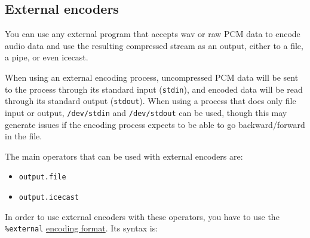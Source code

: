 \documentclass{book}
\begin{document}

\subsection{External encoders}
You can use any external program that accepts wav or raw PCM data to encode
audio data and use the resulting compressed stream as an output, either to a
file, a pipe, or even icecast.

When using an external encoding process, uncompressed PCM data will be sent to
the process through its standard input (\verb+stdin+), and encoded data will be
read through its standard output (\verb+stdout+). When using a process that does
only file input or output, \verb+/dev/stdin+ and \verb+/dev/stdout+ can be used,
though this may generate issues if the encoding process expects to be able to go
backward/forward in the file.

The main operators that can be used with external encoders are:
\begin{itemize}
\item \verb+output.file+
\item \verb+output.icecast+
\end{itemize}
In order to use external encoders with these operators, you have to use the
\verb+%external+ \href{encoding_formats.html}{encoding format}.
Its syntax is:
\end{document}
